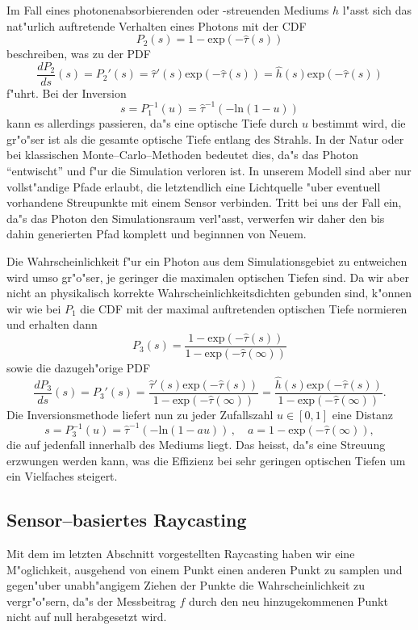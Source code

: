 	Im Fall eines photonenabsorbierenden oder -streuenden Mediums $h$ l"asst sich das nat"urlich auftretende Verhalten eines Photons mit der CDF
	$$P_2(s)=1-\text{exp}(-{\hat \tau}(s))$$
	beschreiben, was zu der PDF
	$$\frac{dP_2}{ds}(s)=P_2'(s)={\hat \tau}'(s)\text{exp}(-{\hat \tau}(s))={\hat h}(s)\text{exp}(-{\hat \tau}(s))$$
	f"uhrt. Bei der Inversion
	$$s=P_1^{-1}(u)={\hat \tau}^{-1}\left(-\text{ln}(1-u)\right)$$
	kann es allerdings passieren, da"s eine optische Tiefe durch $u$ bestimmt wird, die gr"o"ser ist als die gesamte optische Tiefe entlang des Strahls. In der Natur oder bei klassischen Monte--Carlo--Methoden bedeutet dies, da"s das Photon ``entwischt'' und f"ur die Simulation verloren ist. In unserem Modell sind aber nur vollst"andige Pfade erlaubt, die letztendlich eine Lichtquelle "uber eventuell vorhandene Streupunkte mit einem Sensor verbinden. Tritt bei uns der Fall ein, da"s das Photon den Simulationsraum verl"asst, verwerfen wir daher den bis dahin generierten Pfad komplett und beginnnen von Neuem.
	
	Die Wahrscheinlichkeit f"ur ein Photon aus dem Simulationsgebiet zu entweichen wird umso gr"o"ser, je geringer die maximalen optischen Tiefen sind. Da wir aber nicht an physikalisch korrekte Wahrscheinlichkeitsdichten gebunden sind, k"onnen wir wie bei $P_1$ die CDF mit der maximal auftretenden optischen Tiefe normieren und erhalten dann
	$$P_3(s)=\frac{1-\text{exp}(-{\hat \tau}(s))}{1-\text{exp}(-{\hat \tau}(\infty))}$$
	sowie die dazugeh"orige PDF
	$$\frac{dP_3}{ds}(s)=P_3'(s)=\frac{{\hat \tau}'(s)\text{exp}(-{\hat \tau}(s))}{1-\text{exp}(-{\hat \tau}(\infty))}=\frac{{\hat h}(s)\text{exp}(-{\hat \tau}(s))}{1-\text{exp}(-{\hat \tau}(\infty))}.$$
	Die Inversionsmethode liefert nun zu jeder Zufallszahl $u\in[0,1]$ eine Distanz
	$$s=P_3^{-1}(u)={\hat \tau}^{-1}\left(-\text{ln}(1-a u)\right)\,,\quad a=1-\text{exp}(-{\hat \tau}(\infty)),$$
	die auf jedenfall innerhalb des Mediums liegt. Das heisst, da"s eine Streuung erzwungen werden kann, was die Effizienz bei sehr geringen optischen Tiefen um ein Vielfaches steigert.
	
	\subsection{Sensor--basiertes Raycasting}\label{subsec:sensor_based_raycasting}
	Mit dem im letzten Abschnitt vorgestellten Raycasting haben wir eine M"oglichkeit, ausgehend von einem Punkt einen anderen Punkt zu samplen und gegen"uber unabh"angigem Ziehen der Punkte die Wahrscheinlichkeit zu vergr"o"sern, da"s der Messbeitrag $f$ durch den neu hinzugekommenen Punkt nicht auf null herabgesetzt wird.
	

